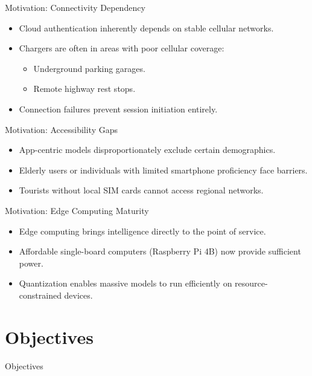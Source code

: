 \documentclass{beamer}
\begin{document}
\begin{frame}{Motivation: Connectivity Dependency}
\begin{itemize}
    \item Cloud authentication inherently depends on stable cellular networks.
    \item Chargers are often in areas with poor cellular coverage:
    \begin{itemize}
        \item Underground parking garages.
        \item Remote highway rest stops.
    \end{itemize}
    \item Connection failures prevent session initiation entirely.
\end{itemize}
\end{frame}

\begin{frame}{Motivation: Accessibility Gaps}
\begin{itemize}
    \item App-centric models disproportionately exclude certain demographics.
    \item Elderly users or individuals with limited smartphone proficiency face barriers.
    \item Tourists without local SIM cards cannot access regional networks.
\end{itemize}
\end{frame}

\begin{frame}{Motivation: Edge Computing Maturity}
\begin{itemize}
    \item Edge computing brings intelligence directly to the point of service.
    \item Affordable single-board computers (Raspberry Pi 4B) now provide sufficient power.
    \item Quantization enables massive models to run efficiently on resource-constrained devices.
\end{itemize}
\end{frame}

\section{Objectives}

\begin{frame}
    \centering
    \Huge Objectives
\end{frame}
\end{document}
